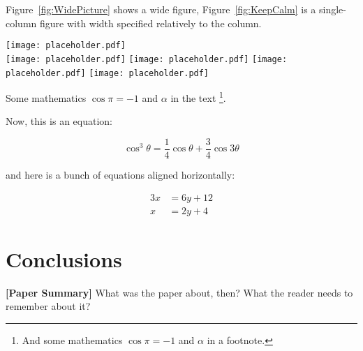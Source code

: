 Figure~\ref{fig:WidePicture} shows a wide figure, Figure~\ref{fig:KeepCalm} is a single-column figure with width specified relatively to the column.
\begin{figure*}[t]\centering %
  \centering
  \texttt{[image: placeholder.pdf]}\\[1pt]
  \texttt{[image: placeholder.pdf]}
  \texttt{[image: placeholder.pdf]}
  \texttt{[image: placeholder.pdf]}
  \texttt{[image: placeholder.pdf]}
  \caption{Wide Picture.  The whole figure can be composed of several smaller images.  If you want to address individual images in the caption or from the text, use the \textit{subcaption} package.}
  \label{fig:WidePicture}
\end{figure*}
Some mathematics $\cos\pi=-1$ and $\alpha$ in the text%
\footnote{And some mathematics $\cos\pi=-1$ and $\alpha$ in a footnote.}.

Now, this is an equation:
\begin{linenomath}
\begin{equation}
\cos^3 \theta =\frac{1}{4}\cos\theta+\frac{3}{4}\cos 3\theta
\label{eq:refname2}
\end{equation}
\end{linenomath}
and here is a bunch of equations aligned horizontally:
\begin{linenomath}
\begin{align}
	3x &= 6y + 12 \\
	x &= 2y + 4
\end{align}
\end{linenomath}



\section{Conclusions}
\label{sec:Conclusions}

\textbf{[Paper Summary]} What was the paper about, then? What the reader needs to remember about it?

